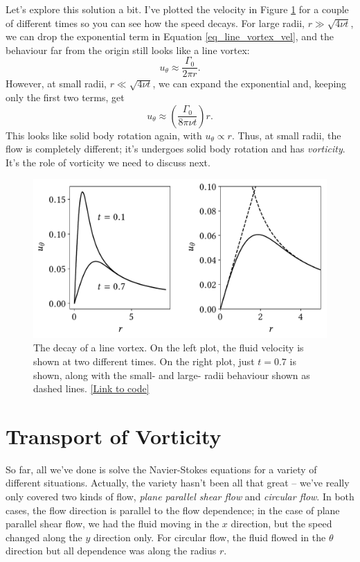 Let's explore this solution a bit.  I've plotted the velocity in Figure \ref{fig_line_vortex} for a couple of different times so you can see how the speed decays.  For large radii, $r \gg \sqrt{4\nu t}$, we can drop the exponential term in Equation \ref{eq_line_vortex_vel}, and the behaviour far from the origin still looks like a line vortex:
\[
u_\theta \approx \frac{\Gamma_0}{2\pi r}.
\]
However, at small radii, $r \ll \sqrt{4 \nu t}$, we can expand the exponential and, keeping only the first two terms, get
\[
u_\theta \approx \left( \frac{\Gamma_0}{8 \pi \nu t} \right) r.
\]
This looks like solid body rotation again, with $u_\theta \propto r$.  Thus, at small radii, the flow is completely different; it's undergoes solid body rotation and has \emph{vorticity}.  It's the role of vorticity we need to discuss next.

\begin{figure}
\centering
\includegraphics[width=0.8\linewidth]{Figures/Chapter2/fig_line_vortex}
\caption{The decay of a line vortex.  On the left plot, the fluid velocity is shown at two different times.  On the right plot, just $t=0.7$ is shown, along with the small- and large- radii behaviour shown as dashed lines. \href{https://nbviewer.jupyter.org/github/josephmacmillan/IntroFluidDynamics/blob/master/Jupyter/2-ViscousFluids.ipynb\#Figure-2.13:-Decay-of-a-line-vortex}{[Link to code]}}
\label{fig_line_vortex}
\end{figure}

%
% 

\section{Transport of Vorticity}

So far, all we've done is solve the Navier-Stokes equations for a variety of different situations.  Actually, the variety hasn't been all that great -- we've really only covered two kinds of flow, \emph{plane parallel shear flow} and \emph{circular flow}.  In both cases, the flow direction is parallel to the flow dependence; in the case of plane parallel shear flow, we had the fluid moving in the $x$ direction, but the speed changed along the $y$ direction only.  For circular flow, the fluid flowed in the $\theta$ direction but all dependence was along the radius $r$.  

